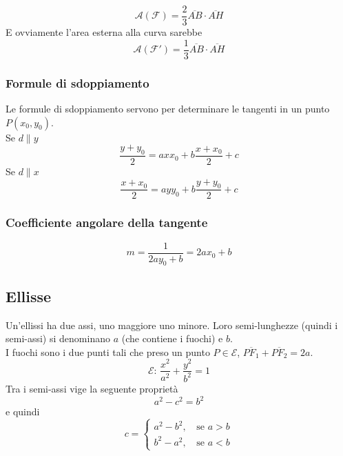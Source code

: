 \begin{equation*}
  \mathscr{A}(\mathscr{F}) = \frac{2}{3}\overline{AB}\cdot\overline{AH}
\end{equation*}
E ovviamente l'area esterna alla curva sarebbe
\begin{equation*}
  \mathscr{A}(\mathscr{F}') = \frac{1}{3}\overline{AB}\cdot\overline{AH}
\end{equation*}

\subsubsection{Formule di sdoppiamento}
Le formule di sdoppiamento servono per determinare le tangenti in un punto $P(x_0,y_0)$.\\
Se $d\|y$
\begin{equation*}
  \frac{y+y_0}{2}=axx_0+b\frac{x+x_0}{2}+c
\end{equation*}
Se $d\|x$
\begin{equation*}
  \frac{x+x_0}{2}=ayy_0+b\frac{y+y_0}{2}+c
\end{equation*}

\subsubsection{Coefficiente angolare della tangente}
\begin{equation*}
  m = \frac{1}{2ay_0+b} = 2ax_0+b
\end{equation*}

\subsection{Ellisse}\label{subsec:geomanal:ellisse}
\begin{center}
\end{center}
Un'ellissi ha due assi, uno maggiore uno minore. Loro semi-lunghezze (quindi i semi-assi) si 
denominano $a$ (che contiene i fuochi) e $b$.\\
I fuochi sono i due punti tali che preso un punto $P\in\mathscr{E}$, 
$\overline{PF_1}+\overline{PF_2} = 2a$.
\begin{equation*}
  \mathscr{E}:\,\frac{x^2}{a^2}+\frac{y^2}{b^2}=1
\end{equation*}
Tra i semi-assi vige la seguente proprietà
\begin{equation*}
  a^2-c^2=b^2
\end{equation*}
e quindi
\begin{equation*}
  c = \begin{cases}
    a^2-b^2,\, &\text{se } a > b\\
    b^2-a^2,\, &\text{se } a < b
  \end{cases}
\end{equation*}

